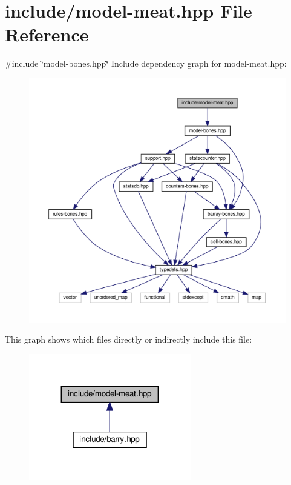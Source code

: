 \hypertarget{model-meat_8hpp}{}\section{include/model-\/meat.hpp File Reference}
\label{model-meat_8hpp}
{\ttfamily \#include \char`\"{}model-\/bones.\+hpp\char`\"{}}\newline
Include dependency graph for model-\/meat.hpp\+:
\nopagebreak
\begin{figure}[H]
\begin{center}
\leavevmode
\includegraphics[width=350pt]{model-meat_8hpp__incl}
\end{center}
\end{figure}
This graph shows which files directly or indirectly include this file\+:
\nopagebreak
\begin{figure}[H]
\begin{center}
\leavevmode
\includegraphics[width=200pt]{model-meat_8hpp__dep__incl}
\end{center}
\end{figure}
